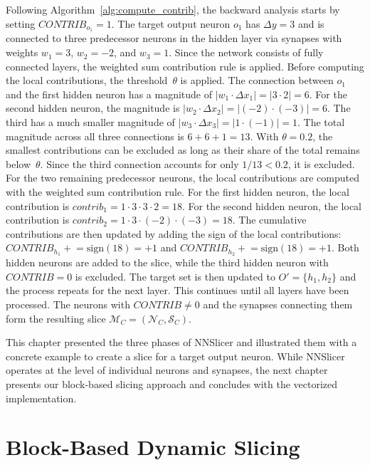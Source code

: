 \documentclass[
12pt,
fancyheadings,
a4paper,
twoside,
BCOR=0.7cm,
nobcorignoretitle,
grayscalebody,
]{stsreprt}
\begin{document}
Following Algorithm~\ref{alg:compute_contrib}, the backward analysis starts by setting
$\textit{CONTRIB}_{o_1} = 1$.
The target output neuron $o_1$ has $\Delta y = 3$ and is connected to three predecessor neurons in
the hidden layer via synapses with weights $w_1 = 3$, $w_2 = -2$, and $w_3 = 1$.
Since the network consists of fully connected layers, the weighted sum contribution rule is
applied.
Before computing the local contributions, the threshold~$\theta$ is applied.
The connection between $o_1$ and the first hidden neuron has a magnitude of $|w_1 \cdot \Delta x_1|
= |3 \cdot 2| = 6$.
For the second hidden neuron, the magnitude is $|w_2 \cdot \Delta x_2| = |(-2) \cdot (-3)| = 6$.
The third has a much smaller magnitude of $|w_3 \cdot \Delta x_3| = |1 \cdot (-1)| = 1$.
The total magnitude across all three connections is $6 + 6 + 1 = 13$.
With $\theta = 0.2$, the smallest contributions can be excluded as long as their share of the total
remains below~$\theta$.
Since the third connection accounts for only $1/13 < 0.2$, it is excluded.
For the two remaining predecessor neurons, the local contributions are computed with the weighted
sum contribution rule.
For the first hidden neuron, the local contribution is $\textit{contrib}_1 = 1 \cdot 3 \cdot 3
\cdot 2 = 18$.
For the second hidden neuron, the local contribution is $\textit{contrib}_2 = 1 \cdot 3 \cdot (-2)
\cdot (-3) = 18$.
The cumulative contributions are then updated by adding the sign of the local contributions:
$\textit{CONTRIB}_{h_1} \mathrel{+}= \text{sign}(18) = +1$ and $\textit{CONTRIB}_{h_2} \mathrel{+}=
\text{sign}(18) = +1$.
Both hidden neurons are added to the slice, while the third hidden neuron with $\textit{CONTRIB} =
0$ is excluded.
The target set is then updated to $O' = \{h_1, h_2\}$ and the process repeats for the next layer.
This continues until all layers have been processed.
The neurons with $\textit{CONTRIB} \neq 0$ and the synapses connecting them form the resulting
slice $\mathcal{M}_C = (\mathcal{N}_C, \mathcal{S}_C)$.

\medskip

This chapter presented the three phases of NNSlicer and illustrated them with a concrete example to
create a slice for a target output neuron.
While NNSlicer operates at the level of individual neurons and synapses, the next chapter presents
our block-based slicing approach and concludes with the vectorized implementation.


\chapter{Block-Based Dynamic Slicing}
\label{ch:approach}
\end{document}
